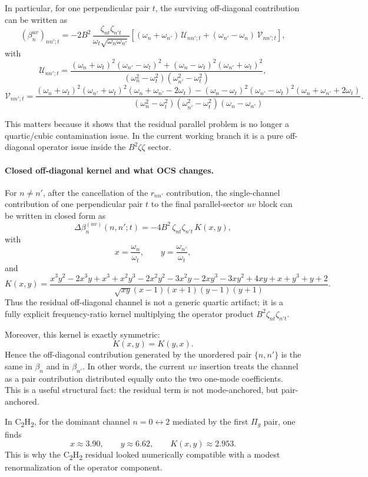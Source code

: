 \documentclass[11pt]{article}
\begin{document}
In particular, for one perpendicular pair $t$, the surviving off-diagonal
contribution can be written as
\[
(\beta_n^{uv})_{nn';t}
=
-2B^2\,\frac{\zeta_{nt}\zeta_{n't}}{\omega_t\sqrt{\omega_n\omega_{n'}}}
\left[
(\omega_n+\omega_{n'})\,\mathcal{U}_{nn';t}
+
(\omega_{n'}-\omega_n)\,\mathcal{V}_{nn';t}
\right],
\]
with
\[
\mathcal{U}_{nn';t}=
\frac{(\omega_n+\omega_t)^2(\omega_{n'}-\omega_t)^2+(\omega_n-\omega_t)^2(\omega_{n'}+\omega_t)^2}
{(\omega_n^2-\omega_t^2)(\omega_{n'}^2-\omega_t^2)},
\]
\[
\mathcal{V}_{nn';t}=
\frac{
(\omega_n+\omega_t)^2(\omega_{n'}+\omega_t)^2(\omega_n+\omega_{n'}-2\omega_t)
-
(\omega_n-\omega_t)^2(\omega_{n'}-\omega_t)^2(\omega_n+\omega_{n'}+2\omega_t)
}
{(\omega_n^2-\omega_t^2)(\omega_{n'}^2-\omega_t^2)(\omega_n-\omega_{n'})}.
\]

This matters because it shows that the residual parallel problem is no longer a
quartic/cubic contamination issue. In the current working branch it is a pure
off-diagonal operator issue inside the $B^2\zeta\zeta$ sector.

\paragraph{Closed off-diagonal kernel and what OCS changes.}
For $n\neq n'$, after the cancellation of the $r_{nn'}$ contribution, the
single-channel contribution of one perpendicular pair $t$ to the final
parallel-sector $uv$ block can be written in closed form as
\[
\Delta\beta_n^{(uv)}(n,n';t)=
-4B^2\,\zeta_{nt}\zeta_{n't}\,K(x,y),
\]
with
\[
x=\frac{\omega_n}{\omega_t},
\qquad
y=\frac{\omega_{n'}}{\omega_t},
\]
and
\[
K(x,y)=
\frac{
x^3y^2-2x^3y+x^3+x^2y^3-2x^2y^2-3x^2y-2xy^3-3xy^2+4xy+x+y^3+y+2
}{
\sqrt{xy}(x-1)(x+1)(y-1)(y+1)
}.
\]
Thus the residual off-diagonal channel is not a generic quartic artifact; it is
a fully explicit frequency-ratio kernel multiplying the operator product
$B^2\zeta_{nt}\zeta_{n't}$.

Moreover, this kernel is exactly symmetric:
\[
K(x,y)=K(y,x).
\]
Hence the off-diagonal contribution generated by the unordered pair
$\{n,n'\}$ is the same in $\beta_n$ and in $\beta_{n'}$. In other words, the
current $uv$ insertion treats the channel as a pair contribution distributed
equally onto the two one-mode coefficients. This is a useful structural fact:
the residual term is not mode-anchored, but pair-anchored.

In \texorpdfstring{C\textsubscript{2}H\textsubscript{2}}{C2H2}, for the
dominant channel $n=0\leftrightarrow 2$ mediated by the first $\Pi_g$ pair, one
finds
\[
x\approx 3.90,
\qquad
y\approx 6.62,
\qquad
K(x,y)\approx 2.953.
\]
This is why the
\texorpdfstring{C\textsubscript{2}H\textsubscript{2}}{C2H2} residual looked
numerically compatible with a modest renormalization of the operator component.
\end{document}
